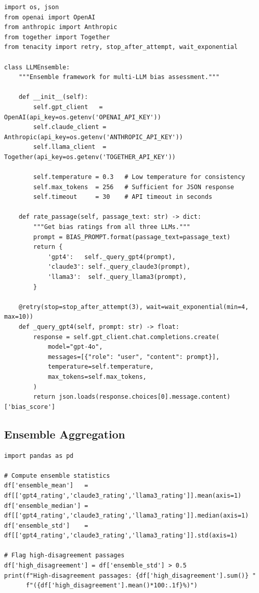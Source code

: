 \documentclass[10pt,letterpaper]{article}
\begin{document}
\begin{lstlisting}[caption={LLM ensemble class with retry logic and rate limiting.},
  label={lst:ensemble}]
import os, json
from openai import OpenAI
from anthropic import Anthropic
from together import Together
from tenacity import retry, stop_after_attempt, wait_exponential

class LLMEnsemble:
    """Ensemble framework for multi-LLM bias assessment."""

    def __init__(self):
        self.gpt_client   = OpenAI(api_key=os.getenv('OPENAI_API_KEY'))
        self.claude_client = Anthropic(api_key=os.getenv('ANTHROPIC_API_KEY'))
        self.llama_client  = Together(api_key=os.getenv('TOGETHER_API_KEY'))

        self.temperature = 0.3   # Low temperature for consistency
        self.max_tokens  = 256   # Sufficient for JSON response
        self.timeout     = 30    # API timeout in seconds

    def rate_passage(self, passage_text: str) -> dict:
        """Get bias ratings from all three LLMs."""
        prompt = BIAS_PROMPT.format(passage_text=passage_text)
        return {
            'gpt4':   self._query_gpt4(prompt),
            'claude3': self._query_claude3(prompt),
            'llama3':  self._query_llama3(prompt),
        }

    @retry(stop=stop_after_attempt(3), wait=wait_exponential(min=4, max=10))
    def _query_gpt4(self, prompt: str) -> float:
        response = self.gpt_client.chat.completions.create(
            model="gpt-4o",
            messages=[{"role": "user", "content": prompt}],
            temperature=self.temperature,
            max_tokens=self.max_tokens,
        )
        return json.loads(response.choices[0].message.content)['bias_score']
\end{lstlisting}

\subsection*{Ensemble Aggregation}

\begin{lstlisting}[caption={Ensemble aggregation: mean, median, and standard
  deviation across LLM ratings.}, label={lst:aggregation}]
import pandas as pd

# Compute ensemble statistics
df['ensemble_mean']   = df[['gpt4_rating','claude3_rating','llama3_rating']].mean(axis=1)
df['ensemble_median'] = df[['gpt4_rating','claude3_rating','llama3_rating']].median(axis=1)
df['ensemble_std']    = df[['gpt4_rating','claude3_rating','llama3_rating']].std(axis=1)

# Flag high-disagreement passages
df['high_disagreement'] = df['ensemble_std'] > 0.5
print(f"High-disagreement passages: {df['high_disagreement'].sum()} "
      f"({df['high_disagreement'].mean()*100:.1f}%)")
\end{lstlisting}
\end{document}

